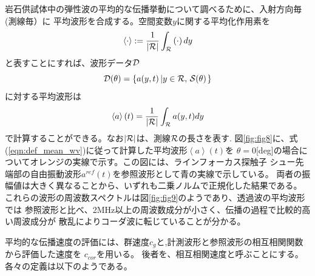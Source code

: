 岩石供試体中の弾性波の平均的な伝播挙動について調べるために、入射方向毎(測線毎）に
平均波形を合成する。空間変数$y$に関する平均化作用素を
\begin{equation}
	\left< \cdot \right> := 
	\frac{1}{ \left| {\cal R} \right| }\int_{\cal R}\left( \cdot \right)dy
	\label{eqn:averaging}
\end{equation}
と表すことにすれば、波形データ${\cal D}$
\begin{equation}
	{\cal D}(\theta)=\left\{ a(y,t) \left| y\in {\cal R}, \, {\cal S}(\theta)\right.\right\}
	\label{eqn:}
\end{equation}
に対する平均波形は
\begin{equation}
	\left< a\right>(t)=
	\frac{1}{\left| {\cal R}\right|}\int_{\cal R}a(y,t)dy
	\label{eqn:def_mean_wv}
\end{equation}
で計算することができる。なお$\left| {\cal R }\right|$は、測線$\cal R$の長さを表す.
図\ref{fig:fig8}に、式(\ref{eqn:def_mean_wv})に従って計算した平均波形$\left<a \right>(t)$を
$\theta=0$[deg]の場合についてオレンジの実線で示す。この図には、ラインフォーカス探触子
シュー先端部の自由振動波形$a^{ref}(t)$を参照波形として青の実線で示している。
両者の振幅値は大きく異なることから、いずれも二乗ノルムで正規化した結果である。
これらの波形の周波数スペクトルは図\ref{fig:fig9}のようであり、透過波の平均波形では
参照波形と比べ、2MHz以上の周波数成分が小さく、伝播の過程で比較的高い周波成分が
散乱によりコーダ波に転じていることが分かる。

平均的な伝播速度の評価には、群速度$c_g$と,計測波形と参照波形の相互相関関数から評価した速度を
$c_{cor}$を用いる。
後者を、相互相関速度と呼ぶことにする。各々の定義は以下のようである。

